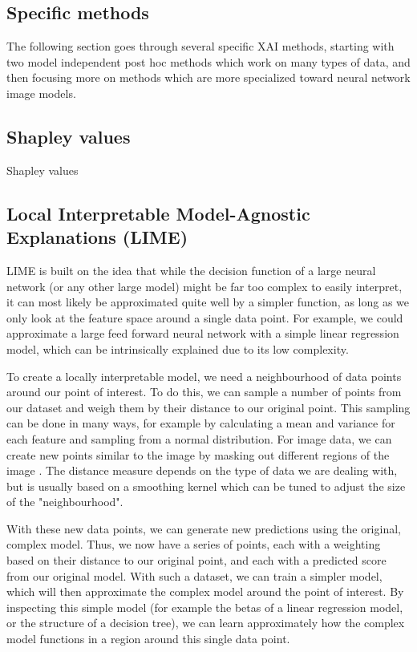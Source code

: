 \documentclass[UKenglish]{uiomasterthesis} %
\theoremstyle{definition}
\begin{document}
\subsection{Specific methods}

The following section goes through several specific XAI methods, starting with two model independent post hoc methods which work on many types of data, and then focusing more on methods which are more specialized toward neural network image models.
\\

\subsection{Shapley values}

Shapley values



\subsection{Local Interpretable Model-Agnostic Explanations (LIME)}

LIME \cite{lime} is built on the idea that while the decision function of a large neural network (or any other large model) might be far too complex to easily interpret, it can most likely be approximated quite well by a simpler function, as long as we only look at the feature space around a single data point. For example, we could approximate a large feed forward neural network with a simple linear regression model, which can be intrinsically explained due to its low complexity.

To create a locally interpretable model, we need a neighbourhood of data points around our point of interest. To do this, we can sample a number of points from our dataset and weigh them by their distance to our original point. This sampling can be done in many ways, for example by calculating a mean and variance for each feature and sampling from a normal distribution. For image data, we can create new points similar to the image by masking out different regions of the image \cite{molnar}. The distance measure depends on the type of data we are dealing with, but is usually based on a smoothing kernel which can be tuned to adjust the size of the "neighbourhood".

With these new data points, we can generate new predictions using the original, complex model. Thus, we now have a series of points, each with a weighting based on their distance to our original point, and each with a predicted score from our original model. With such a dataset, we can train a simpler model, which will then approximate the complex model around the point of interest. By inspecting this simple model (for example the betas of a linear regression model, or the structure of a decision tree), we can learn approximately how the complex model functions in a region around this single data point.
\end{document}

